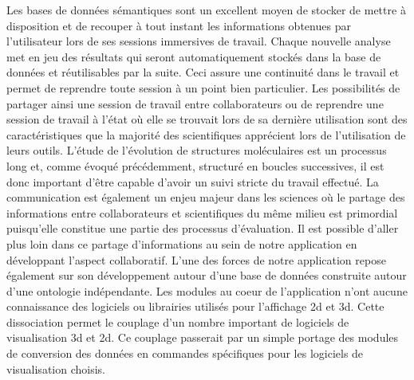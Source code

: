 Les bases de données sémantiques sont un excellent moyen de stocker de mettre à disposition et de recouper à tout instant les informations obtenues par l'utilisateur lors de ses sessions immersives de travail. Chaque nouvelle analyse met en jeu des résultats qui seront automatiquement stockés dans la base de données et réutilisables par la suite. Ceci assure une continuité dans le travail et permet de reprendre toute session à un point bien particulier. Les possibilités de partager ainsi une session de travail entre collaborateurs ou de reprendre une session de travail à l'état où elle se trouvait lors de sa dernière utilisation sont des caractéristiques que la majorité des scientifiques apprécient lors de l'utilisation de leurs outils. L'étude de l'évolution de structures moléculaires est un processus long et, comme évoqué précédemment, structuré en boucles successives, il est donc important d'être capable d'avoir un suivi stricte du travail effectué. La communication est également un enjeu majeur dans les sciences où le partage des informations entre collaborateurs et scientifiques du même milieu est primordial puisqu'elle constitue une partie des processus d'évaluation. Il est possible d'aller plus loin dans ce partage d'informations au sein de notre application en développant l'aspect collaboratif. L'une des forces de notre application repose également sur son développement autour d'une base de données construite autour d'une ontologie indépendante. Les modules au coeur de l'application n'ont aucune connaissance des logiciels ou librairies utilisés pour l'affichage 2d et 3d. Cette dissociation permet le couplage d'un nombre important de logiciels de visualisation 3d et 2d. Ce couplage passerait par un simple portage des modules de conversion des données en commandes spécifiques pour les logiciels de visualisation choisis.
